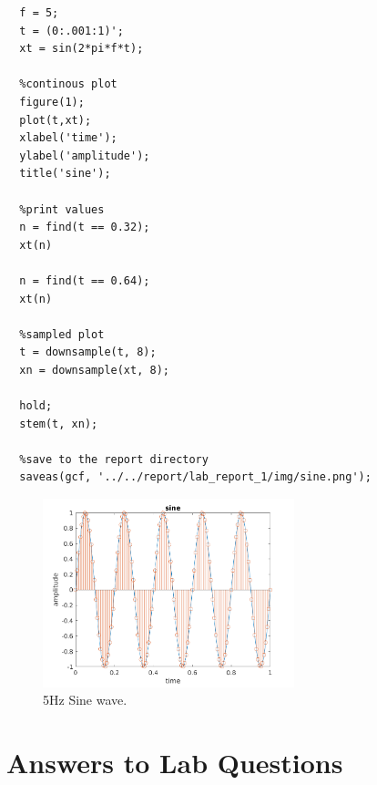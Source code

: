 \documentclass{article}
\begin{document}
\begin{verbatim}
  f = 5;
  t = (0:.001:1)';
  xt = sin(2*pi*f*t);

  %continous plot
  figure(1);
  plot(t,xt);
  xlabel('time');
  ylabel('amplitude');
  title('sine');

  %print values
  n = find(t == 0.32);
  xt(n)

  n = find(t == 0.64);
  xt(n)

  %sampled plot
  t = downsample(t, 8);
  xn = downsample(xt, 8);

  hold;
  stem(t, xn);

  %save to the report directory
  saveas(gcf, '../../report/lab_report_1/img/sine.png');
\end{verbatim}

\begin{figure}[h]
  \begin{center}
    \includegraphics[width=0.65\textwidth]{img/sine.png}
    \caption{5Hz Sine wave.}
  \end{center}
\end{figure}



\section{Answers to Lab Questions}
\end{document}
